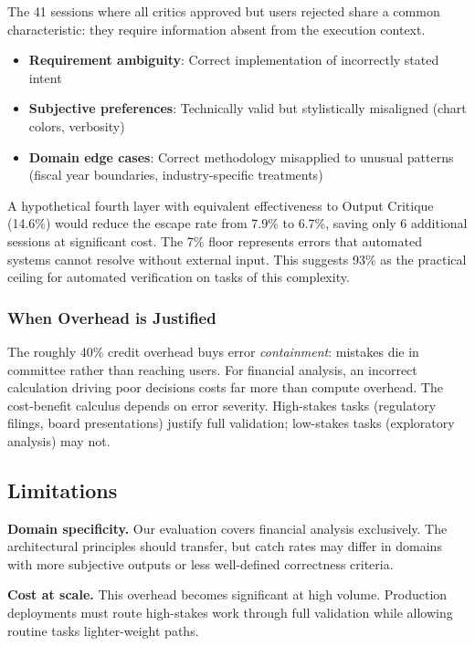 \documentclass[sigconf]{acmart}
\begin{document}
The 41 sessions where all critics approved but users rejected share a common characteristic: they require information absent from the execution context.

\begin{itemize}
  \item \textbf{Requirement ambiguity}: Correct implementation of incorrectly stated intent
  \item \textbf{Subjective preferences}: Technically valid but stylistically misaligned (chart colors, verbosity)
  \item \textbf{Domain edge cases}: Correct methodology misapplied to unusual patterns (fiscal year boundaries, industry-specific treatments)
\end{itemize}

A hypothetical fourth layer with equivalent effectiveness to Output Critique (14.6\%) would reduce the escape rate from 7.9\% to 6.7\%, saving only 6 additional sessions at significant cost. The 7\% floor represents errors that automated systems cannot resolve without external input. This suggests 93\% as the practical ceiling for automated verification on tasks of this complexity.

\subsubsection{When Overhead is Justified}

The roughly 40\% credit overhead buys error \textit{containment}: mistakes die in committee rather than reaching users. For financial analysis, an incorrect calculation driving poor decisions costs far more than compute overhead. The cost-benefit calculus depends on error severity. High-stakes tasks (regulatory filings, board presentations) justify full validation; low-stakes tasks (exploratory analysis) may not.

\subsection{Limitations}

\textbf{Domain specificity.} Our evaluation covers financial analysis exclusively. The architectural principles should transfer, but catch rates may differ in domains with more subjective outputs or less well-defined correctness criteria.

\textbf{Cost at scale.} This overhead becomes significant at high volume. Production deployments must route high-stakes work through full validation while allowing routine tasks lighter-weight paths.
\end{document}

